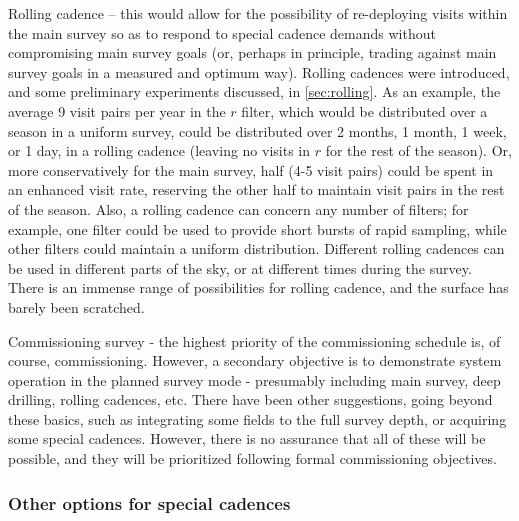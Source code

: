 \begin{description}
\item{Rolling cadence} -- this would allow for the possibility of
re-deploying visits within the main survey so as to respond to special
cadence demands without compromising main survey goals (or, perhaps in
principle, trading against main survey goals in a measured and optimum
way). Rolling cadences were introduced, and some preliminary experiments discussed, in \autoref{sec:rolling}.  As an example, the
average 9 visit pairs per year in the $r$ filter, which would be
distributed over a season in a uniform survey, could be distributed over
2 months, 1 month, 1 week, or 1 day, in a rolling cadence (leaving no
visits in $r$ for the rest of the season).  Or, more conservatively for
the main survey, half (4-5 visit pairs) could be spent in an enhanced
visit rate, reserving the other half to maintain visit pairs in the rest
of the season.  Also, a rolling cadence can concern any number of
filters; for example, one filter could be used to provide short bursts
of rapid sampling, while other filters could maintain a uniform
distribution.  Different rolling cadences can be used in different parts
of the sky, or at different times during the survey.  There is an
immense range of possibilities for rolling cadence, and the surface has
barely been scratched.

\item{Commissioning survey} - the highest priority of the commissioning
schedule is, of course, commissioning.  However, a secondary objective
is to demonstrate system operation in the planned survey mode -
presumably including main survey, deep drilling, rolling cadences, etc.
There have been other suggestions, going beyond these basics, such as
integrating some fields to the full survey depth, or acquiring some
special cadences.  However, there is no assurance that all of these will
be possible, and they will be prioritized following formal commissioning
objectives.

\end{description}

\subsubsection{Other options for special cadences}

